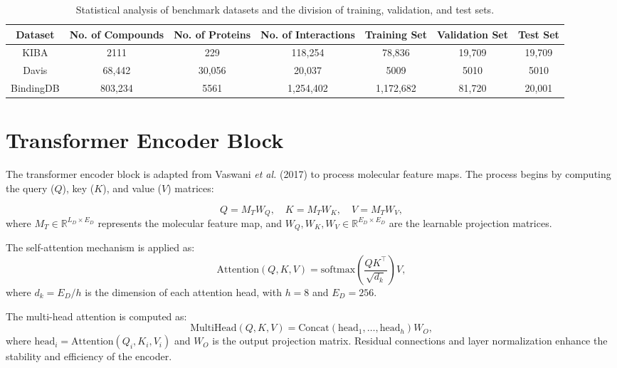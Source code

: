\documentclass{article}
\begin{document}
\begin{table}[ht]
	\centering
	\caption{Statistical analysis of benchmark datasets and the division of training, validation, and test sets.}
	\label{tab:datasets}
	\begin{tabular}{ccccccc}
		\toprule
		\textbf{Dataset} & \textbf{No. of Compounds} & \textbf{No. of Proteins} & \textbf{No. of Interactions} & \textbf{Training Set} & \textbf{Validation Set} & \textbf{Test Set} \\
		\midrule
		KIBA       & 2111     & 229    & 118,254   & 78,836  & 19,709 & 19,709 \\
		Davis      & 68,442   & 30,056 & 20,037    & 5009    & 5010   & 5010   \\
		BindingDB  & 803,234  & 5561   & 1,254,402 & 1,172,682 & 81,720 & 20,001 \\
		\bottomrule
	\end{tabular}
\end{table}

\section{Transformer Encoder Block}
The transformer encoder block is adapted from Vaswani \textit{et al.} (2017) to process molecular feature maps. The process begins by computing the query ($Q$), key ($K$), and value ($V$) matrices:

\begin{equation}
	Q = M_T W_Q, \quad K = M_T W_K, \quad V = M_T W_V,
\end{equation}
where $M_T \in \mathbb{R}^{L_D \times E_D}$ represents the molecular feature map, and $W_Q, W_K, W_V \in \mathbb{R}^{E_D \times E_D}$ are the learnable projection matrices.

The self-attention mechanism is applied as:
\begin{equation}
	\text{Attention}(Q, K, V) = \text{softmax}\left(\frac{Q K^\top}{\sqrt{d_k}}\right)V,
\end{equation}
where $d_k = E_D / h$ is the dimension of each attention head, with $h=8$ and $E_D=256$.

The multi-head attention is computed as:
\begin{equation}
	\text{MultiHead}(Q, K, V) = \text{Concat}(\text{head}_1, \ldots, \text{head}_h) W_O,
\end{equation}
where $\text{head}_i = \text{Attention}(Q_i, K_i, V_i)$ and $W_O$ is the output projection matrix. Residual connections and layer normalization enhance the stability and efficiency of the encoder.
\end{document}
